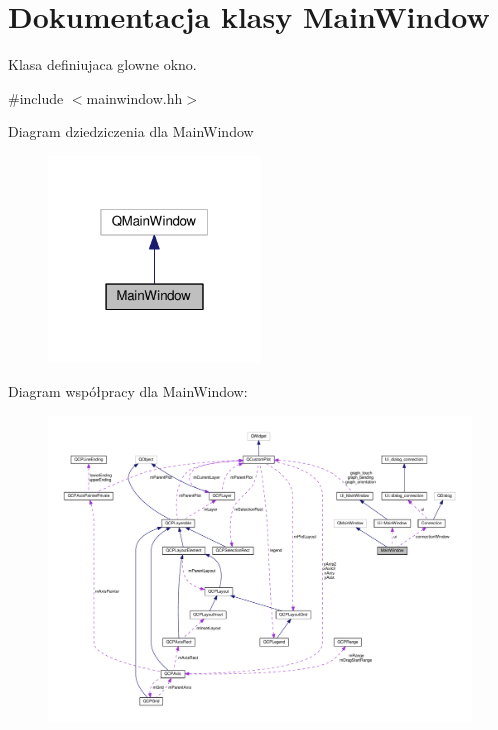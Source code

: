 \hypertarget{class_main_window}{}\section{Dokumentacja klasy Main\+Window}
\label{class_main_window}


Klasa definiujaca glowne okno.  




{\ttfamily \#include $<$mainwindow.\+hh$>$}



Diagram dziedziczenia dla Main\+Window\nopagebreak
\begin{figure}[H]
\begin{center}
\leavevmode
\includegraphics[width=160pt]{class_main_window__inherit__graph}
\end{center}
\end{figure}


Diagram współpracy dla Main\+Window\+:\nopagebreak
\begin{figure}[H]
\begin{center}
\leavevmode
\includegraphics[width=350pt]{class_main_window__coll__graph}
\end{center}
\end{figure}

